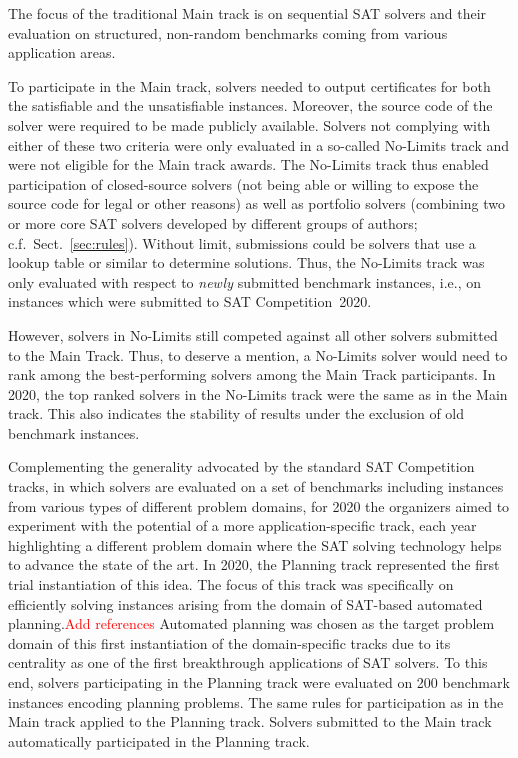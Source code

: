 \documentclass{elsarticle}
\begin{document}
The focus of the traditional Main track is on sequential SAT solvers and their evaluation on structured, non-random benchmarks coming from various application areas. 

To participate in the Main track, solvers needed to output certificates for both the satisfiable and the unsatisfiable instances. 
Moreover, the source code of the solver were required to be made publicly available. 
Solvers not complying with either of these two criteria were only evaluated in a so-called No-Limits track and were not eligible for the Main track awards.
The No-Limits track thus enabled participation of closed-source solvers (not being able or willing to expose the source code for legal or other reasons) 
as well as portfolio solvers (combining two or more core SAT solvers developed by different groups of authors; c.f.~Sect.~\ref{sec:rules}).
Without limit, submissions could be solvers that use a lookup table or similar to determine solutions. 
Thus, the No-Limits track was only evaluated with respect to \emph{newly} submitted benchmark instances, i.e., on instances which were submitted to SAT Competition~2020. 

However, solvers in No-Limits still competed against all other solvers submitted to the Main Track.
Thus, to deserve a mention, a No-Limits solver would need to rank among the best-performing solvers among the Main Track participants.
In 2020, the top ranked solvers in the No-Limits track were the same as in the Main track. 
This also indicates the stability of results under the exclusion of old benchmark instances. 

Complementing the generality advocated by the standard SAT Competition tracks, in which solvers are evaluated
on a set of benchmarks including instances from various types of different problem domains, for 2020 
the organizers aimed to experiment with the potential of a more application-specific track,
each year highlighting a different problem domain where the SAT solving technology helps to advance the state of the art.
In 2020, the Planning track represented the first trial instantiation of this idea.
The focus of this track was specifically on efficiently solving
instances arising from the domain of SAT-based automated planning.\textcolor{red}{Add references} 
Automated planning was chosen as the target problem domain of this first instantiation of the domain-specific tracks
due to its centrality as one of the first breakthrough applications of SAT solvers.
To this end, solvers participating in the Planning
track were evaluated on 200 benchmark instances encoding planning problems.
The same rules for participation as in the Main track applied to the Planning track.
Solvers submitted to the Main track automatically participated in the Planning track.
\end{document}
